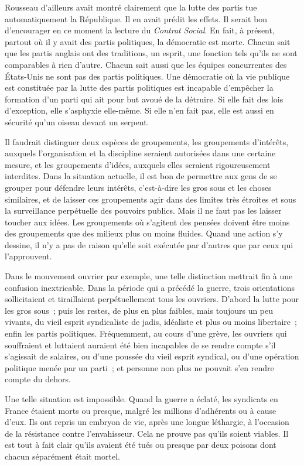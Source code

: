 \documentclass[french,twoside]{book} %
\begin{document}
Rousseau d'ailleurs avait montré clairement que la lutte des partis tue automatiquement la République. Il en avait prédit les effets. Il serait bon d'encourager en ce moment la lecture du {\itshape Contrat Social}. En fait, à présent, partout où il y avait des partis politiques, la démocratie est morte. Chacun sait que les partis anglais ont des traditions, un esprit, une fonction tels qu'ils ne sont comparables à rien d'autre. Chacun sait aussi que les équipes concurrentes des États-Unis ne sont pas des partis politiques. Une démocratie où la vie publique est constituée par la lutte des partis politiques est incapable d'empêcher la formation d'un parti qui ait pour but avoué de la détruire. Si elle fait des lois d'exception, elle s'asphyxie elle-même. Si elle n'en fait pas, elle est aussi en sécurité qu'un oiseau devant un serpent.\par
Il faudrait distinguer deux espèces de groupements, les groupements d'intérêts, auxquels l'organisation et la discipline seraient autorisées dans une certaine mesure, et les groupements d'idées, auxquels elles seraient rigoureusement interdites. Dans la situation actuelle, il est bon de permettre aux gens de se grouper pour défendre leurs intérêts, c'est-à-dire les gros sous et les choses similaires, et de laisser ces groupements agir dans des limites très étroites et sous la surveillance perpétuelle des pouvoirs publics. Mais il ne faut pas les laisser toucher aux idées. Les groupements où s'agitent des pensées doivent être moins des groupements que des milieux plus ou moins fluides. Quand une action s'y dessine, il n'y a pas de raison qu'elle soit exécutée par d'autres que par ceux qui l'approuvent.\par
Dans le mouvement ouvrier par exemple, une telle distinction mettrait fin à une confusion inextricable. Dans la période qui a précédé la guerre, trois orientations sollicitaient et tiraillaient perpétuellement tous les ouvriers. D'abord la lutte pour les gros sous ; puis les restes, de plus en plus faibles, mais toujours un peu vivants, du vieil esprit syndicaliste de jadis, idéaliste et plus ou moins libertaire ; enfin les partis politiques. Fréquemment, au cours d'une grève, les ouvriers qui souffraient et luttaient auraient été bien incapables de se rendre compte s'il s'agissait de salaires, ou d'une poussée du vieil esprit syndical, ou d'une opération politique menée par un parti ; et personne non plus ne pouvait s'en rendre compte du dehors.\par
Une telle situation est impossible. Quand la guerre a éclaté, les syndicats en France étaient morts ou presque, malgré les millions d'adhérents ou à cause d'eux. Ils ont repris un embryon de vie, après une longue léthargie, à l'occasion de la résistance contre l'envahisseur. Cela ne prouve pas qu'ils soient viables. Il est tout à fait clair qu'ils avaient été tués ou presque par deux poisons dont chacun séparément était mortel.\par
\end{document}
